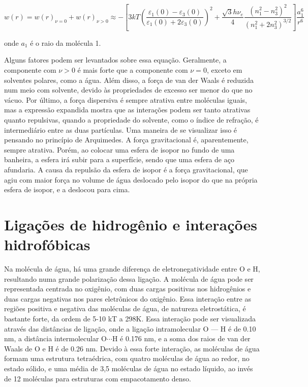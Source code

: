 	\begin{equation}
		w ( r ) = w ( r ) _ { \nu = 0 } + w ( r ) _ { \nu > 0 } \approx - \left[ 3 k T \left( \frac { \varepsilon _ { 1 } ( 0 ) - \varepsilon _ { 3 } ( 0 ) } { \varepsilon _ { 1 } ( 0 ) + 2 \varepsilon _ { 3 } ( 0 ) } \right) ^ { 2 } + \frac { \sqrt { 3 } h \nu _ { e } } { 4 } \frac { \left( n _ { 1 } ^ { 2 } - n _ { 3 } ^ { 2 } \right) ^ { 2 } } { \left( n _ { 1 } ^ { 2 } + 2 n _ { 3 } ^ { 2 } \right) ^ { 3 / 2 } } \right] \frac { a _ { 1 } ^ { 6 } } { r ^ { 6 } }
		\label{eqn:energia_maclachlan}
	\end{equation}
	
	\noindent onde \(a_1\) é o raio da molécula 1.
	
	Alguns fatores podem ser levantados sobre essa equação. Geralmente, a componente com \(\nu > 0\) é mais forte que a componente com \(\nu = 0\), exceto em solventes polares, como a água. Além disso, a força de van der Waals é reduzida num meio com solvente, devido às propriedades de excesso ser menor do que no vácuo. Por último, a força dispersiva é sempre atrativa entre moléculas iguais, mas a expressão expandida mostra que as interações podem ser tanto atrativas quanto repulsivas, quando a propriedade do solvente, como o índice de refração, é intermediário entre as duas partículas. Uma maneira de se visualizar isso é pensando no princípio de Arquimedes. A força gravitacional é, aparentemente, sempre atrativa. Porém, ao colocar uma esfera de isopor no fundo de uma banheira, a esfera irá subir para a superfície, sendo que uma esfera de aço afundaria. A causa da repulsão da esfera de isopor é a força gravitacional, que agiu com maior força no volume de água deslocado pelo isopor do que na própria esfera de isopor, e a deslocou para cima.
	
	\section{Ligações de hidrogênio e interações hidrofóbicas}
	
	Na molécula de água, há uma grande diferença de eletronegatividade entre O e H, resultando numa grande polarização dessa ligação. A molécula de água pode ser representada centrada no oxigênio, com duas cargas positivas nos hidrogênios e duas cargas negativas nos pares eletrônicos do oxigênio. Essa interação entre as regiões positiva e negativa das moléculas de água, de natureza eletrostática, é bastante forte, da ordem de 5-10 kT a 298K. Essa interação pode ser visualizada através das distâncias de ligação, onde a ligação intramolecular O --- H é de 0.10 nm, a distância intermolecular \(\mathrm{O} \cdots \mathrm{H}\) é 0.176 nm, e a soma dos raios de van der Waals de O e H é de 0.26 nm. Devido à essa forte interação, as moléculas de água formam uma estrutura tetraédrica, com quatro moléculas de água ao redor, no estado sólido, e uma média de 3,5 moléculas de água no estado líquido, ao invés de 12 moléculas para estruturas com empacotamento denso.
	
